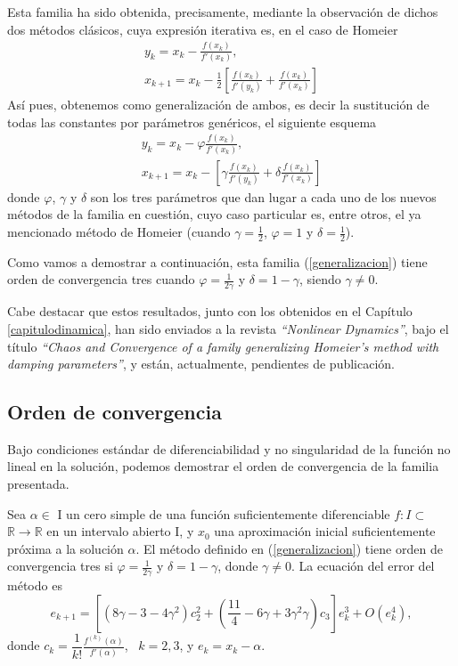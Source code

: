 Esta familia ha sido obtenida, precisamente, mediante la observación de dichos dos métodos clásicos, cuya expresión iterativa es, en el caso de Homeier
\begin{gather}\label{homeier}
y_k=x_k-\frac{f(x_k)}{f'(x_k)}, \\\nonumber x_{k+1}=x_k-\frac{1}{2}\left[\frac{f(x_k)}{f'(y_k)}+\frac{f(x_k)}{f'(x_k)}\right]
\end{gather}
Así pues, obtenemos como generalización de ambos, es decir la sustitución de todas las constantes por parámetros genéricos, el siguiente esquema
\begin{gather}\label{generalizacion}
y_k=x_k-\varphi\frac{f(x_k)}{f'(x_k)}, \\\nonumber x_{k+1}=x_k-\left[\gamma\frac{f(x_k)}{f'(y_k)}+\delta\frac{f(x_k)}{f'(x_k)}\right]
\end{gather}
donde $\varphi$, $\gamma$ y $\delta$ son los tres parámetros que dan lugar a cada uno de los nuevos métodos de la familia en cuestión, cuyo caso particular es, entre otros, el ya mencionado método de Homeier (cuando $\gamma=\frac{1}{2}$, $\varphi=1$ y $\delta=\frac{1}{2}$).

Como vamos a demostrar a continuación, esta familia (\ref{generalizacion}) tiene orden de convergencia tres cuando $\varphi=\frac{1}{2\gamma}$ y $\delta=1-\gamma$, siendo $\gamma \neq 0$.

Cabe destacar que estos resultados, junto con los obtenidos en el Capítulo \ref{capitulodinamica}, han sido enviados a la revista \textit{``Nonlinear Dynamics''}, bajo el título \textit{``Chaos and Convergence of a family generalizing Homeier's method with damping parameters''}, y están, actualmente, pendientes de publicación.

\subsection{Orden de convergencia}\label{ordenhg}
Bajo condiciones estándar de diferenciabilidad y no singularidad de la función no lineal en la solución, podemos demostrar el orden de convergencia de la familia presentada.
\begin{theorem}\label{teorema2}
	Sea $\alpha \in$ I un cero simple de una función suficientemente diferenciable $f : I \subset$ $\mathbb{R} \to \mathbb{R}$ en un intervalo abierto I, y $x_0$ una aproximación inicial suficientemente próxima a la solución $\alpha$. El método definido en (\ref{generalizacion}) tiene orden de convergencia tres si $\varphi=\frac{1}{2\gamma}$ y $\delta=1-\gamma$, donde $\gamma \neq 0$. La ecuación del error del método es
	\begin{equation*}
	e_{k+1}=\left[\left(8\gamma-3-4\gamma^2\right)c_2^2+\left(\frac{11}{4}-6\gamma+3\gamma^2\gamma\right)c_3\right]e^3_k+O(e^4_k),
	\end{equation*}
	\mbox{donde} $c_k=\dfrac{1}{k!}\frac{f^{(k)}(\alpha)}{f'(\alpha)}$, \  $k=2,3$,  y $e_k=x_k-\alpha$.
\end{theorem}

